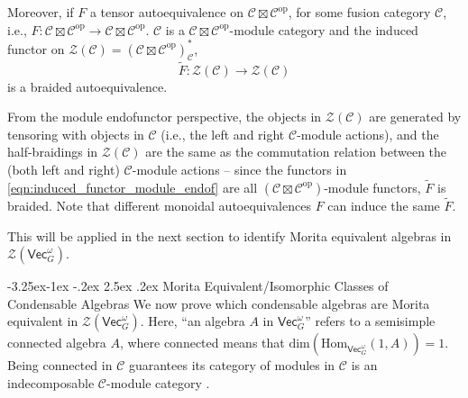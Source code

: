\documentclass[aps,twocolumn,prx,floatfix,preprintnumbers, nofootinbib,10pt]{revtex4-2}
\makeatletter
\numberwithin{equation}{section}
\theoremstyle{definition}
\newcommand{\be}{\begin{equation}}
\newcommand{\ee}{\end{equation}}
\newcommand{\lb}{\left(}
\newcommand{\rb}{\right)}
\newcommand{\wt}{\widetilde}
\newcommand{\cC}{\mathcal{C}}
\newcommand{\cZ}{\mathcal{Z}}
\newcommand{\Hom}{\text{Hom}}
\renewcommand{\Vec}{\mathsf{Vec}}
\renewcommand{\dim}{\text{dim}}
\newcommand{\Vect}{\mathsf{Vec}}
\renewcommand\subsubsection{\@startsection{subsubsection}{3}{\z@}%
                                     {-3.25ex\@plus -1ex \@minus -.2ex}%
                                     {2.5ex \@plus .2ex}%
                                     {\centering\itshape\bfseries\small}}
\def\ad{\mathop{\mathrm{ad}}\nolimits}
\makeatother
\begin{document}
Moreover, if $F$ a tensor autoequivalence on $\cC \boxtimes \cC^{\text{op}}$, for some fusion category $\cC$, i.e., $F: \cC \boxtimes \cC^{\text{op}} \rightarrow \cC \boxtimes \cC^{\text{op}}$. $\cC$ is a $\cC \boxtimes \cC^{\text{op}}$-module category and
the induced functor on $\cZ(\cC)=(\cC \boxtimes \cC^{\text{op}})_{\cC}^*$,
\be
    \wt{F}: \cZ(\cC) \rightarrow \cZ(\cC)
\ee
is a braided autoequivalence.

From the module endofunctor perspective, the objects in $\cZ(\cC)$ are generated by tensoring with objects in $\cC$ (i.e., the left and right $\cC$-module actions), and the half-braidings in $\cZ(\cC)$ are the same as the commutation relation between the (both left and right) $\cC$-module actions -- since the functors in \eqref{eqn:induced_functor_module_endof} are all $(\cC\boxtimes \cC^{\text{op}})$-module functors, $\wt{F}$ is braided. Note that different monoidal autoequivalences $F$ can induce the same $\wt{F}$.

This will be applied in the next section to identify Morita equivalent algebras in $\cZ(\Vec_G^\omega)$.


\subsubsection{Morita Equivalent/Isomorphic Classes of Condensable Algebras}
\label{sec:Morita_Equiv_Cond_algs}
We now prove which condensable algebras are Morita equivalent in $\cZ(\Vec_G^\omega)$. Here, ``an algebra $A$ in $\Vec_G^\omega$'' refers to a semisimple connected algebra $A$, where connected means that $\dim\lb \Hom_{\Vec_G^\omega}(1,A) \rb=1$. Being connected in $\cC$ guarantees its category of modules in $\cC$ is an indecomposable $\cC$-module category \cite{davydov2013witt}.
\end{document}
